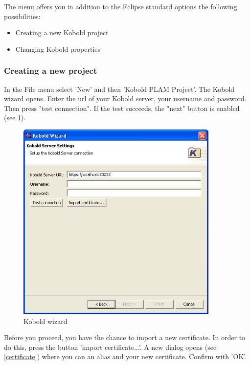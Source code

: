 The menu offers you in addition to the Eclipse standard options the following
possibilities:
\begin{itemize}
	\item Creating a new Kobold project
	\item Changing Kobold properties
\end{itemize}

\subsubsection{Creating a new project}

In the File menu select 'New' and then 'Kobold PLAM Project'. The Kobold wizard opens.
Enter the url of your Kobold server, your username and password. Then press
"test connection". If the test succeeds, the "next" button is enabled (see \ref{wizard1}).

\begin{figure}[h!]
\begin{center}
\includegraphics[width=10cm]{wizard1.png}
   \caption{Kobold wizard}
\label{wizard1}
\end{center}
\end{figure}\par

Before you proceed, you have the chance to import a new certificate. In order to do this,
press the button 'import certificate...'. A new dialog opens (see \ref{certificate}) where you 
can an alias and your new certificate. Confirm with 'OK'.

